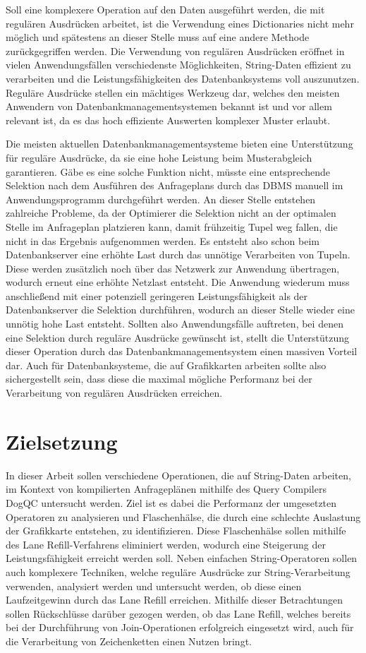 Soll eine komplexere Operation auf den Daten ausgeführt werden, die mit regulären Ausdrücken arbeitet, ist die Verwendung eines Dictionaries nicht mehr möglich und spätestens an dieser Stelle muss auf eine andere Methode zurückgegriffen werden.
Die Verwendung von regulären Ausdrücken eröffnet in vielen Anwendungsfällen verschiedenste Möglichkeiten, String-Daten effizient zu verarbeiten und die Leistungsfähigkeiten des Datenbanksystems voll auszunutzen.
Reguläre Ausdrücke stellen ein mächtiges Werkzeug dar, welches den meisten Anwendern von Datenbankmanagementsystemen bekannt ist und vor allem relevant ist, da es das hoch effiziente Auswerten komplexer Muster erlaubt.

Die meisten aktuellen Datenbankmanagementsysteme bieten eine Unterstützung für reguläre Ausdrücke, da sie eine hohe Leistung beim Musterabgleich garantieren.
Gäbe es eine solche Funktion nicht, müsste eine entsprechende Selektion nach dem Ausführen des Anfrageplans durch das DBMS manuell im Anwendungsprogramm durchgeführt werden.
An dieser Stelle entstehen zahlreiche Probleme, da der Optimierer die Selektion nicht an der optimalen Stelle im Anfrageplan platzieren kann, damit frühzeitig Tupel weg fallen, die nicht in das Ergebnis aufgenommen werden.
Es entsteht also schon beim Datenbankserver eine erhöhte Last durch das unnötige Verarbeiten von Tupeln.
Diese werden zusätzlich noch über das Netzwerk zur Anwendung übertragen, wodurch erneut eine erhöhte Netzlast entsteht.
Die Anwendung wiederum muss anschließend mit einer potenziell geringeren Leistungsfähigkeit als der Datenbankserver die Selektion durchführen, wodurch an dieser Stelle wieder eine unnötig hohe Last entsteht.
Sollten also Anwendungsfälle auftreten, bei denen eine Selektion durch reguläre Ausdrücke gewünscht ist, stellt die Unterstützung dieser Operation durch das Datenbankmanagementsystem einen massiven Vorteil dar.
Auch für Datenbanksysteme, die auf Grafikkarten arbeiten sollte also sichergestellt sein, dass diese die maximal mögliche Performanz bei der Verarbeitung von regulären Ausdrücken erreichen.

\section{Zielsetzung}

In dieser Arbeit sollen verschiedene Operationen, die auf String-Daten arbeiten, im Kontext von kompilierten Anfrageplänen mithilfe des Query Compilers DogQC untersucht werden.
Ziel ist es dabei die Performanz der umgesetzten Operatoren zu analysieren und Flaschenhälse, die durch eine schlechte Auslastung der Grafikkarte entstehen, zu identifizieren.
Diese Flaschenhälse sollen mithilfe des Lane Refill-Verfahrens eliminiert werden, wodurch eine Steigerung der Leistungsfähigkeit erreicht werden soll.
Neben einfachen String-Operatoren sollen auch komplexere Techniken, welche reguläre Ausdrücke zur String-Verarbeitung verwenden, analysiert werden und untersucht werden, ob diese einen Laufzeitgewinn durch das Lane Refill erreichen.
Mithilfe dieser Betrachtungen sollen Rückschlüsse darüber gezogen werden, ob das Lane Refill, welches bereits bei der Durchführung von Join-Operationen erfolgreich eingesetzt wird, auch für die Verarbeitung von Zeichenketten einen Nutzen bringt.

